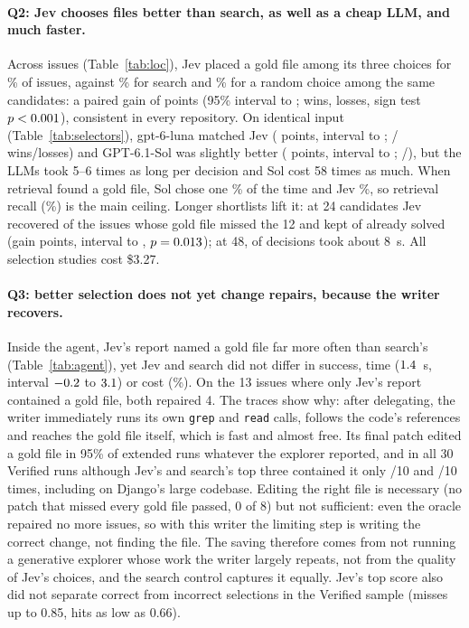 \documentclass{article}
\begin{document}
\paragraph{Q2: Jev chooses files better than search, as well as a cheap LLM, and much faster.}
Across \LocN{} issues (Table~\ref{tab:loc}), Jev placed a gold file among its three choices for \LocJev\% of issues, against \LocSearch\% for search and \LocRandom\% for a random choice among the same candidates: a paired gain of \LocDiff{} points (95\% interval \LocLow{} to \LocHigh{}; \LocWins{} wins, \LocLosses{} losses, sign test $p < 0.001$), consistent in every repository. On identical input (Table~\ref{tab:selectors}), gpt-6-luna matched Jev (\LlmLunaVsJev{} points, interval \LlmLunaVsJevLow{} to \LlmLunaVsJevHigh{}; \LlmLunaVsJevWins/\LlmLunaVsJevLosses{} wins/losses) and GPT-6.1-Sol was slightly better (\LlmSolVsJev{} points, interval \LlmSolVsJevLow{} to \LlmSolVsJevHigh{}; \LlmSolVsJevWins/\LlmSolVsJevLosses), but the LLMs took 5--6 times as long per decision and Sol cost 58 times as much. When retrieval found a gold file, Sol chose one \LlmSolCond\% of the time and Jev \LocJevCond\%, so retrieval recall (\LocRecall\%) is the main ceiling. Longer shortlists lift it: at 24 candidates Jev recovered \SwRescueTwentyFour{} of the \SwNear{} issues whose gold file missed the 12 and kept \SwKeptTwentyFour{} of \SwKeptBase{} already solved (gain \SwDiffTwentyFour{} points, interval \SwLowTwentyFour{} to \SwHighTwentyFour{}, $p = 0.013$); at 48, \SwSlowFortyEight{} of \SwN{} decisions took about 8~s. All selection studies cost \$3.27.

\paragraph{Q3: better selection does not yet change repairs, because the writer recovers.}
Inside the agent, Jev's report named a gold file far more often than search's (Table~\ref{tab:agent}), yet Jev and search did not differ in success, time ($1.4$~s, interval $-0.2$ to $3.1$) or cost (\AgJevSearchCostPct\%). On the 13 issues where only Jev's report contained a gold file, both repaired 4. The traces show why: after delegating, the writer immediately runs its own \texttt{grep} and \texttt{read} calls, follows the code's references and reaches the gold file itself, which is fast and almost free. Its final patch edited a gold file in 95\% of extended runs whatever the explorer reported, and in all 30 Verified runs although Jev's and search's top three contained it only \VJevGoldReturned/10 and \VSearchGoldReturned/10 times, including on Django's large codebase. Editing the right file is necessary (no patch that missed every gold file passed, 0 of 8) but not sufficient: even the oracle repaired no more issues, so with this writer the limiting step is writing the correct change, not finding the file. The saving therefore comes from not running a generative explorer whose work the writer largely repeats, not from the quality of Jev's choices, and the search control captures it equally. Jev's top score also did not separate correct from incorrect selections in the Verified sample (misses up to 0.85, hits as low as 0.66).
\end{document}
